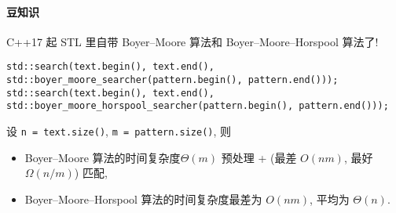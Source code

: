 \paragraph{豆知识}

C++17 起 STL 里自带 Boyer--Moore 算法和 Boyer--Moore--Horspool 算法了!

\begin{verbatim}
std::search(text.begin(), text.end(), std::boyer_moore_searcher(pattern.begin(), pattern.end()));
std::search(text.begin(), text.end(), std::boyer_moore_horspool_searcher(pattern.begin(), pattern.end()));
\end{verbatim}

设 \verb|n = text.size()|, \verb|m = pattern.size()|, 则

\begin{itemize}
    \item Boyer--Moore 算法的时间复杂度\(\Theta(m)\) 预处理 + (最差 \(O(nm)\), 最好 \(\Omega(n/m)\)) 匹配, \cite{enwiki:1185721721}
    \item Boyer--Moore--Horspool 算法的时间复杂度最差为 \(O(nm)\), 平均为 \(\Theta(n)\). \cite{enwiki:1136480391}
\end{itemize}
